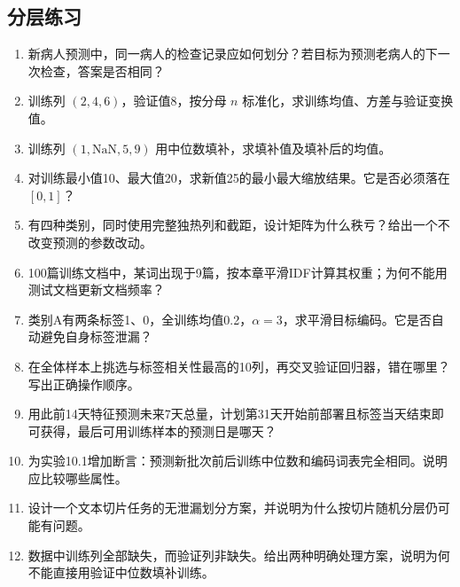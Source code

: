 \documentclass[UTF8,fontset=none,zihao=-4,a4paper]{ctexart}
\numberwithin{equation}{section}
\numberwithin{figure}{section}
\begin{document}
\subsection{分层练习}
\begin{enumerate}[label=10.\arabic*,before={\interlinepenalty=10000}]
\item 新病人预测中，同一病人的检查记录应如何划分？若目标为预测老病人的下一次检查，答案是否相同？
\item 训练列 $(2,4,6)$，验证值8，按分母 $n$ 标准化，求训练均值、方差与验证变换值。
\item 训练列 $(1,\mathrm{NaN},5,9)$ 用中位数填补，求填补值及填补后的均值。
\item 对训练最小值10、最大值20，求新值25的最小最大缩放结果。它是否必须落在 $[0,1]$？
\item 有四种类别，同时使用完整独热列和截距，设计矩阵为什么秩亏？给出一个不改变预测的参数改动。
\item 100篇训练文档中，某词出现于9篇，按本章平滑IDF计算其权重；为何不能用测试文档更新文档频率？
\item 类别A有两条标签1、0，全训练均值0.2，$\alpha=3$，求平滑目标编码。它是否自动避免自身标签泄漏？
\item 在全体样本上挑选与标签相关性最高的10列，再交叉验证回归器，错在哪里？写出正确操作顺序。
\item 用此前14天特征预测未来7天总量，计划第31天开始前部署且标签当天结束即可获得，最后可用训练样本的预测日是哪天？
\item 为实验10.1增加断言：预测新批次前后训练中位数和编码词表完全相同。说明应比较哪些属性。
\item 设计一个文本切片任务的无泄漏划分方案，并说明为什么按切片随机分层仍可能有问题。
\item 数据中训练列全部缺失，而验证列非缺失。给出两种明确处理方案，说明为何不能直接用验证中位数填补训练。
\end{enumerate}

\clearpage
\end{document}

